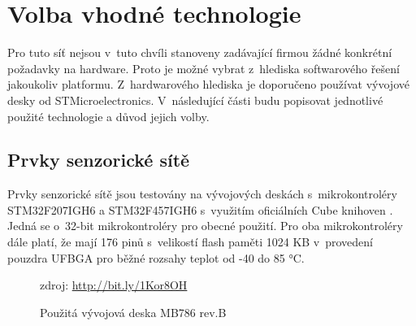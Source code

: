 \chapter{Volba vhodné technologie}
Pro tuto síť nejsou v~tuto chvíli stanoveny zadávající firmou žádné konkrétní požadavky na hardware. Proto je možné vybrat z~hlediska softwarového řešení jakoukoliv platformu. Z~hardwarového hlediska je doporučeno používat vývojové desky od STMicroelectronics.  V~následující části budu popisovat jednotlivé použité technologie a důvod jejich volby.

\section{Prvky senzorické sítě}
Prvky senzorické sítě jsou testovány na vývojových deskách s~mikrokontroléry STM32F207IGH6 a STM32F457IGH6 s~využitím oficiálních Cube knihoven \cite{cube}. Jedná se o~32-bit mikrokontroléry pro obecné použití. Pro oba mikrokontroléry dále platí, že mají 176 pinů s~velikostí flash paměti 1024 KB v~provedení pouzdra UFBGA pro běžné rozsahy teplot od -40 do 85 °C. 

\begin{figure}[h]
    \centering
	\caption{Použitá vývojová deska MB786 rev.B}
	\small zdroj: \url{http://bit.ly/1Kor8OH}
	\label{fig:eval-board}
\end{figure}

